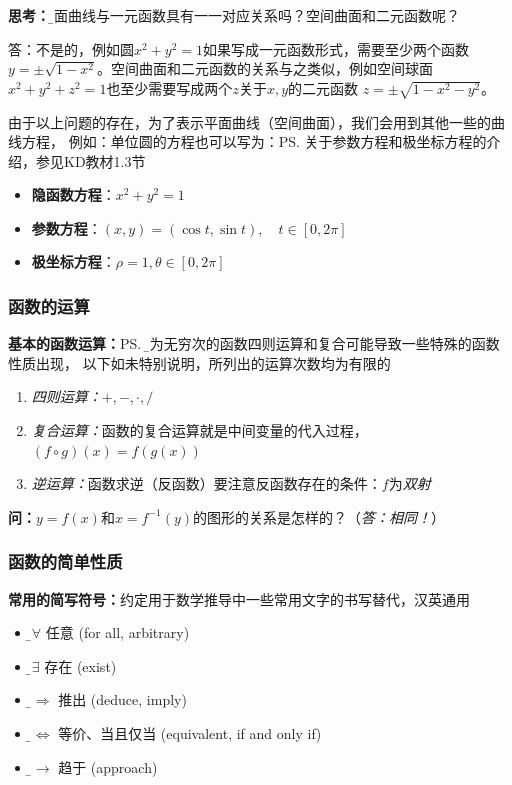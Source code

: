 	{\bf 思考：}{\b 平面曲线与一元函数具有一一对应关系吗？}空间曲面和二元函数呢？
	
	答：不是的，例如圆$x^2+y^2=1$如果写成一元函数形式，需要至少两个函数
	$y=\pm\sqrt{1-x^2}$。空间曲面和二元函数的关系与之类似，例如空间球面
	$x^2+y^2+z^2=1$也至少需要写成两个$z$关于$x,y$的二元函数
	$z=\pm\sqrt{1-x^2-y^2}$。
	
	由于以上问题的存在，为了表示平面曲线（空间曲面），我们会用到其他一些的曲线方程，
	例如：单位圆的方程也可以写为：\ps{关于参数方程和极坐标方程的介绍，参见KD教材1.3节}
	\begin{itemize}
		\item {\bf 隐函数方程}：$x^2+y^2=1$
		\item {\bf 参数方程}：$(x,y)=(\cos t,\sin t),\quad t\in[0,2\pi]$
		\item {\bf 极坐标方程}：$\rho=1,\theta\in[0,2\pi]$
	\end{itemize}
	
\subsubsection{函数的运算}

{\bf 基本的函数运算：}\ps{\b 因为无穷次的函数四则运算和复合可能导致一些特殊的函数性质出现，
以下如未特别说明，所列出的运算次数均为有限的}
\begin{enumerate}
  \setlength{\itemindent}{1cm}
  \item {\it 四则运算：}$+,-,\cdot,/$
  \item {\it 复合运算：}函数的复合运算就是中间变量的代入过程，$(f\circ g)(x)=f(g(x))$
  \item {\it 逆运算：}函数求逆（反函数）要注意反函数存在的条件：$f$为{\it 双射}
\end{enumerate}

{\bf 问：}$y=f(x)$和$x=f^{-1}(y)$的图形的关系是怎样的？（{\it 答：相同！}）

\subsubsection{函数的简单性质}
	
\begin{shaded}
	{\bf 常用的简写符号：}约定用于数学推导中一些常用文字的书写替代，汉英通用
	\begin{itemize}
	  \setlength{\itemindent}{1cm}
	  \item {\b$\bm{\forall}$} \quad 任意 (for all, arbitrary)
	  \item {\b$\bm{\exists}$} \quad 存在 (exist)
	  \item {\b$\bm{\Rightarrow}$} \quad 推出 (deduce, imply)
	  \item {\b$\bm{\Leftrightarrow}$} \quad 等价、当且仅当 (equivalent, if and only if)
	  \item {\b$\bm{\to}$} \quad 趋于 (approach)
	\end{itemize}
\end{shaded}

